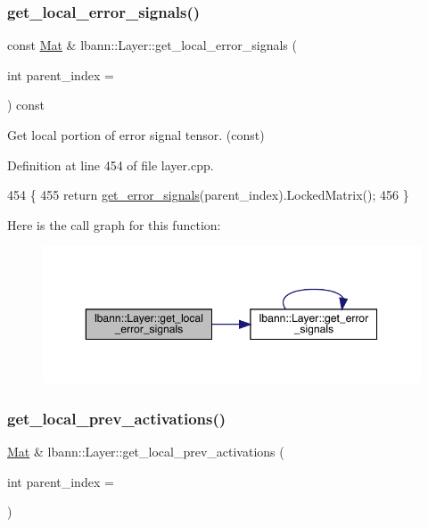 \subsubsection{\texorpdfstring{get\+\_\+local\+\_\+error\+\_\+signals()}{get\_local\_error\_signals()}\hspace{0.1cm}{\footnotesize\ttfamily [2/2]}}
{\footnotesize\ttfamily const \hyperlink{base_8hpp_a68f11fdc31b62516cb310831bbe54d73}{Mat} \& lbann\+::\+Layer\+::get\+\_\+local\+\_\+error\+\_\+signals (\begin{DoxyParamCaption}\item[{int}]{parent\+\_\+index = {} }\end{DoxyParamCaption}) const}

Get local portion of error signal tensor. (const) 

Definition at line 454 of file layer.\+cpp.


\begin{DoxyCode}
454                                                                 \{
455   \textcolor{keywordflow}{return} \hyperlink{classlbann_1_1Layer_adb561e140e0bb601f3c5a8ee053a71d2}{get\_error\_signals}(parent\_index).LockedMatrix();
456 \}
\end{DoxyCode}
Here is the call graph for this function\+:\nopagebreak
\begin{figure}[H]
\begin{center}
\leavevmode
\includegraphics[width=350pt]{classlbann_1_1Layer_acf76bc7fba1e8ab74947ef83a3c8a141_cgraph}
\end{center}
\end{figure}
\mbox{\label{classlbann_1_1Layer_a35397843bb0c84030000c7d872229acb}} 
\subsubsection{\texorpdfstring{get\+\_\+local\+\_\+prev\+\_\+activations()}{get\_local\_prev\_activations()}\hspace{0.1cm}{\footnotesize\ttfamily [1/2]}}
{\footnotesize\ttfamily \hyperlink{base_8hpp_a68f11fdc31b62516cb310831bbe54d73}{Mat} \& lbann\+::\+Layer\+::get\+\_\+local\+\_\+prev\+\_\+activations (\begin{DoxyParamCaption}\item[{int}]{parent\+\_\+index = {} }\end{DoxyParamCaption})}

